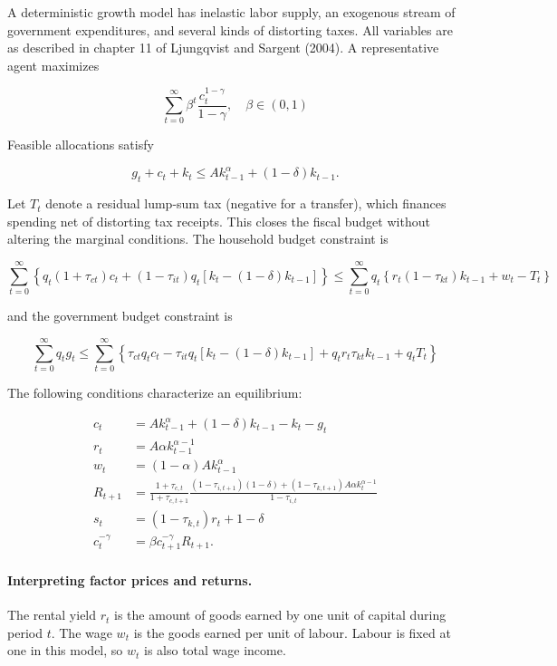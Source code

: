 \documentclass[12pt]{article}
\begin{document}
A deterministic growth model has inelastic labor supply, an exogenous stream of government expenditures, and several kinds of distorting taxes. All variables are as described in chapter 11 of Ljungqvist and Sargent (2004). A representative agent maximizes

$$
\sum_{t=0}^{\infty} \beta^{t} \frac{c_{t}^{1-\gamma}}{1-\gamma}, \quad \beta \in(0,1)
$$

Feasible allocations satisfy

$$
g_{t}+c_{t}+k_{t} \leq A k_{t-1}^{\alpha}+(1-\delta) k_{t-1} .
$$

Let $T_t$ denote a residual lump-sum tax (negative for a transfer), which finances spending net of distorting tax receipts. This closes the fiscal budget without altering the marginal conditions. The household budget constraint is

$$
\sum_{t=0}^{\infty}\left\{q_{t}\left(1+\tau_{c t}\right)c_t+\left(1-\tau_{i t}\right) q_{t}\left[k_{t}-(1-\delta) k_{t-1}\right]\right\} \leq \sum_{t=0}^{\infty}q_t\left\{r_{t}\left(1-\tau_{k t}\right) k_{t-1}+w_{t}-T_t\right\}
$$

and the government budget constraint is

$$
\sum_{t=0}^{\infty} q_{t} g_{t} \leq \sum_{t=0}^{\infty}\left\{\tau_{c t} q_{t} c_{t}-\tau_{i t} q_{t}\left[k_{t}-(1-\delta) k_{t-1}\right]+q_t r_{t} \tau_{k t} k_{t-1}+q_t T_t\right\}
$$

The following conditions characterize an equilibrium:


\begin{align*}
c_t &= A k_{t-1}^\alpha+(1-\delta)k_{t-1}-k_{t}-g_t \tag{7}\\
r_t &= A\alpha k_{t-1}^{\alpha-1} \tag{8}\\
w_t &= (1-\alpha)A k_{t-1}^\alpha \tag{9}\\
R_{t+1} &= \frac{1+\tau_{c,t}}{1+\tau_{c,t+1}}
 \frac{(1-\tau_{i,t+1})(1-\delta)+(1-\tau_{k,t+1})A\alpha k_{t}^{\alpha-1}}
      {1-\tau_{i,t}} \tag{10}\\
s_t &= (1-\tau_{k,t})r_t+1-\delta \tag{11}\\
c_t^{-\gamma} &= \beta c_{t+1}^{-\gamma}R_{t+1}. \tag{12}
\end{align*}


\paragraph{Interpreting factor prices and returns.}
The rental yield $r_t$ is the amount of goods earned by one unit of capital during period $t$. The wage $w_t$ is the goods earned per unit of labour. Labour is fixed at one in this model, so $w_t$ is also total wage income.
\end{document}
